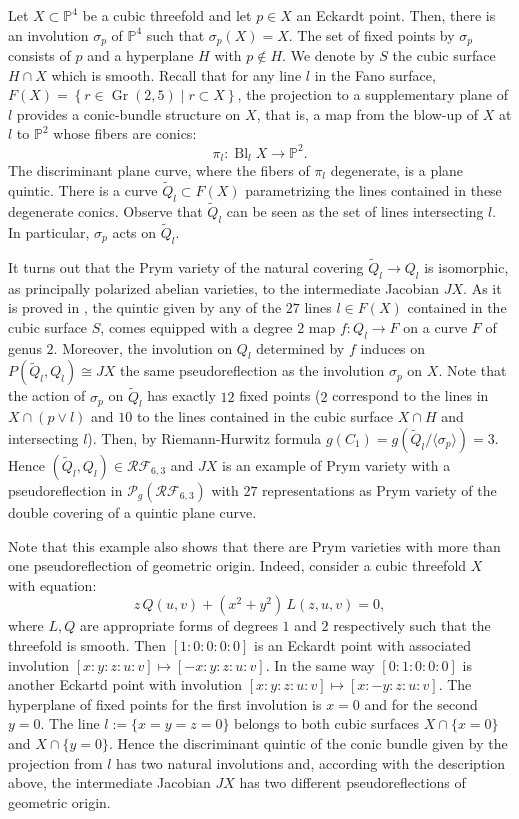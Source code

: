 \documentclass[preprint,12pt]{amsart}
\def\bP{\ensuremath{\mathbb{P}}}
\def\cF{\ensuremath{\mathcal{F}}}
\def\cP{\ensuremath{\mathcal{P}}}
\def\cR{\ensuremath{\mathcal{R}}}
\newcommand{\set}[1]{\left\{#1\right\}}
\theoremstyle{plain}
\theoremstyle{definition}
\begin{document}
Let $X\subset \mathbb P^4$ be a cubic threefold and let $p\in X$ an Eckardt point.
Then, there is an involution $\sigma_p $ of $\mathbb P^4$ such that $\sigma_p(X)=X$.
The set of fixed points by $\sigma_p $ consists of $p$ and a hyperplane $H$ with $p\notin H$.
We denote by $S$ the cubic surface $H\cap X$ which is smooth.
Recall that for any line $l$ in the Fano surface, $F(X)=\set{r\in \operatorname{Gr}(2,5)\mid r\subset X}$, the projection to a supplementary plane of $l$ provides a conic-bundle structure on $X$, that is, a map from the blow-up of $X$ at $l$ to $\bP^2$ whose fibers are conics:
\[
\pi_l:\operatorname{Bl}_l X \to \bP^2.
\]
The discriminant plane curve, where the fibers of $\pi_l$ degenerate, is a plane quintic.
There is a curve $\widetilde Q_l\subset F(X)$ parametrizing the lines contained in these degenerate conics. Observe that $\widetilde Q_l$ can be seen as the set of lines intersecting $l$. In particular, $\sigma_p$ acts on $\widetilde Q_l$.

It turns out that the Prym variety of the natural covering $\widetilde Q_l\rightarrow Q_l$ is isomorphic, as principally polarized abelian varieties, to the intermediate Jacobian $JX$.
As it is proved in \cite[Lemma~7.10]{CZ}, the quintic given by any of the $27$ lines $l\in F(X)$ contained in the cubic surface $S$, comes equipped with a degree $2$ map $f:Q_l\rightarrow F$ on a curve $F$ of genus $2$.
Moreover, the involution on $Q_l$ determined by $f$ induces on $P(\widetilde Q_l,Q_l)\cong JX$ the same pseudoreflection as the involution $\sigma_p$ on $X$.
Note that the action of $\sigma_p$ on $\widetilde Q_l$ has exactly $12$ fixed points ($2$ correspond to the lines in $X\cap(p\vee l)$ and $10$ to the lines contained in the cubic surface $X\cap H$ and intersecting $l$). Then, by Riemann-Hurwitz formula $g(C_1)=g(\widetilde Q_l/\langle \sigma_p \rangle)=3.$  
Hence $(\widetilde Q_l,Q_l)\in \cR\cF_{6,3} $ and $JX$ is an example of Prym variety with a pseudoreflection in $\cP_g(\cR\cF_{6,3})$ with $27$ representations as Prym variety of the double covering of a quintic plane curve.

Note that this example also shows that there are Prym varieties with more than one pseudoreflection of geometric origin.
Indeed, consider a cubic threefold $X$ with equation:
\[
z \, Q(u,v)+ (x^2+y^2)\, L(z,u,v)=0,
\]
where $L, Q$ are appropriate forms of degrees $1$ and $2$ respectively such that the threefold is smooth.
Then $[1:0:0:0:0]$ is an Eckardt point with associated involution $[x:y:z:u:v]\mapsto [-x:y:z:u:v]$.
In the same way $[0:1:0:0:0]$ is another Eckartd point with involution $[x:y:z:u:v]\mapsto [x:-y:z:u:v]$.
The hyperplane of fixed points for the first involution is $x=0$ and for the second $y=0$.
The line $l:=\{x=y=z=0\}$ belongs to both cubic surfaces $X\cap \{x=0\}$ and $X\cap \{y=0\}$.
Hence the discriminant quintic of the conic bundle given by the projection from $l$ has two natural involutions and, according with the description above, the intermediate Jacobian $JX$ has two different pseudoreflections of geometric origin.
\end{document}
